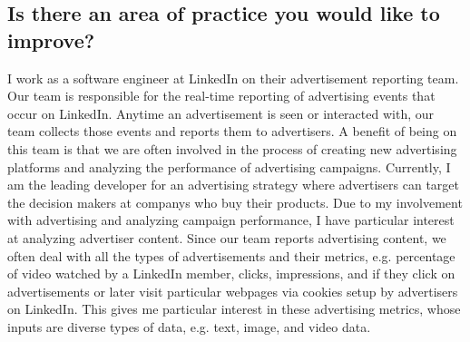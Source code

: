 \subsection{Is there an area of practice you would like to improve?}

I work as a software engineer at LinkedIn on their advertisement reporting team.  Our team is responsible for the real-time reporting of advertising events that occur on LinkedIn.  Anytime an advertisement is seen or interacted with, our team collects those events and reports them to advertisers.  A benefit of being on this team is that we are often involved in the process of creating new advertising platforms and analyzing the performance of advertising campaigns.  Currently, I am the leading developer for an advertising strategy where advertisers can target the decision makers at companys who buy their products.  Due to my involvement with advertising and analyzing campaign performance, I have particular interest at analyzing advertiser content.  Since our team reports advertising content, we often deal with all the types of advertisements and their metrics, e.g. percentage of video watched by a LinkedIn member, clicks, impressions, and if they click on advertisements or later visit particular webpages via cookies setup by advertisers on LinkedIn.  This gives me particular interest in these advertising metrics, whose inputs are diverse types of data, e.g. text, image, and video data.  
